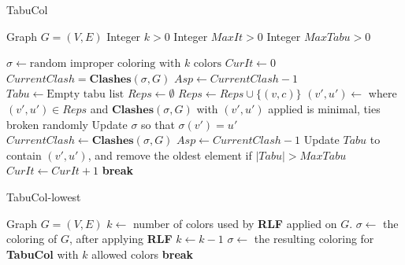 \documentclass[a4paper]{article}
\newcommand{\algorithmicbreak}{\textbf{break}}
\newcommand{\BREAK}{\STATE \algorithmicbreak}
\begin{document}
\begin{algorithm}[H]
    \caption{TabuCol}
    \begin{algorithmic}[1]
        \REQUIRE Graph $G = (V,E)$
        \REQUIRE Integer $k > 0$
        \REQUIRE Integer $MaxIt > 0$
        \REQUIRE Integer $MaxTabu > 0$
      
        \STATE $\sigma \leftarrow \text{random improper coloring with $k$ colors}$
        \STATE $CurIt \leftarrow 0$
        \STATE $CurrentClash = \textbf{Clashes}(\sigma,G)$
        \STATE $Asp \leftarrow CurrentClash-1$
        \STATE $Tabu \leftarrow \text{Empty tabu list}$
            \STATE $Reps \leftarrow \emptyset$
                        \STATE $Reps \leftarrow Reps \cup \{(v,c)\}$
                    \ENDIF
                \ENDFOR
            \ENDFOR
            \STATE $(v',u') \leftarrow $ where $(v',u') \in Reps$ and $\textbf{Clashes}(\sigma,G)$ with $(v',u')$ applied is minimal, ties broken randomly
            \STATE Update $\sigma$ so that $\sigma(v') = u'$
            \STATE $CurrentClash \leftarrow \textbf{Clashes}(\sigma,G)$
                \STATE $Asp \leftarrow CurrentClash -1$
            \ENDIF
            \STATE Update $Tabu$ to contain $(v',u')$, and remove the oldest element if $|Tabu| > MaxTabu$
            \STATE $CurIt \leftarrow CurIt + 1$
                \BREAK
            \ENDIF
        \ENDWHILE
    \end{algorithmic}
\end{algorithm}
\begin{algorithm}[H]
    \caption{TabuCol-lowest}
    \label{alg:tabu-lowest}
    \begin{algorithmic}[1]
        \REQUIRE Graph $G = (V,E)$
        \STATE $k \leftarrow $ number of colors used by \textbf{RLF} applied on $G$.
        \STATE $\sigma \leftarrow $ the coloring of $G$, after applying \textbf{RLF}
                \STATE $k \leftarrow k-1$
                \STATE $\sigma \leftarrow $ the resulting coloring for \textbf{TabuCol} with $k$ allowed colors
            \ELSE
                \BREAK
            \ENDIF
        \ENDWHILE
    \end{algorithmic}
\end{algorithm}
\end{document}
